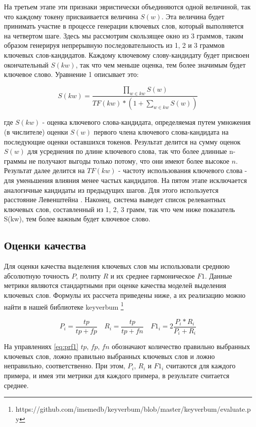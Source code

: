 \documentclass[14pt]{matmex-diploma-custom}
\begin{document}
На третьем этапе эти признаки  эвристически объединяются одной величиной, так что каждому токену присваивается величина $S(w)$. Эта величина будет принимать участие в  процессе генерации ключевых слов, который выполняется на четвертом шаге. Здесь мы рассмотрим скользящее окно из 3 граммов, таким образом генерируя непрерывную последовательность из 1, 2 и 3 граммов ключевых слов-кандидатов. Каждому ключевому слову-кандидату будет присвоен окончательный $S(kw)$, так что чем меньше оценка, тем более значимым будет ключевое слово. Уравнение 1 описывает это:

\begin{equation}
    S(kw) = \frac{\prod_{w \in kw}{S(w)}}{TF(kw)*(1+\sum_{w\in kw}{S(w)})}
\end{equation}

где $S(kw)$ - оценка ключевого слова-кандидата, определяемая путем умножения (в числителе) оценки $S(w)$ первого члена ключевого слова-кандидата на последующие оценки оставшихся токенов. Результат делится на сумму оценок $S(w)$ для усреднения по длине ключевого слова, так что более длинные n-граммы не получают выгоды только потому, что они имеют более высокое $n$. Результат далее делится на $TF(kw)$ - частоту использования ключевого слова - для уменьшения влияния менее частых кандидатов. На пятом этапе исключается аналогичные кандидаты из предыдущих шагов. Для этого используется расстояние Левенштейна \cite{Levenshtein_SPD66}. Наконец, система выведет список релевантных ключевых слов, составленный из 1, 2, 3 грамм, так что чем ниже показатель S(kw), тем более важным будет ключевое слово.


\subsection{Оценки качества}
Для оценки качества выделения ключевых слов мы использовали среднюю абсолютную точность $P$, полнту $R$ и их среднее гармоническое $F1$.
Данные метрики являются стандартными при оценке качества моделей выделения ключевых слов.
Формулы их рассчета приведены ниже, а их реализацию можно найти в нашей библиотеке keyverbum \footnote{https://github.com/imemedb/keyverbum/blob/master/keyverbum/evaluate.py}

\begin{equation}\label{eq:prf1}
    P_{i} = \frac{tp}{tp + fp} \quad R_{i} = \frac{tp}{tp + fn} \quad F1_{i}=2\frac{P_{i}*R_{i}}{P_{i}+R_{i}}
\end{equation}

На управлениях \ref{eq:prf1} $tp$, $fp$, $fn$ обозначают количество правильно выбранных ключевых слов, ложно правильно выбранных ключевых слов и ложно неправильно, соответственно.
При этом, $P_i$, $R_i$ и $F1_i$ считаются для каждого примера, и имея эти метрики для каждого примера, в результате считается среднее.
\end{document}

